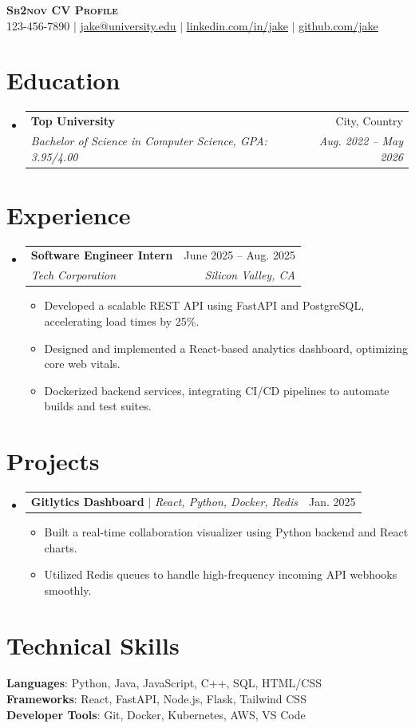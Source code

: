 \documentclass[letterpaper,11pt]{article}
\makeatletter
\newcommand{\resumeItem}[1]{
  \item\small{
    {#1 \vspace{-2pt}}
  }
}
\newcommand{\resumeSubheading}[4]{
  \vspace{-2pt}\item
    \begin{tabular*}{0.97\textwidth}[t]{l@{\extracolsep{\fill}}r}
      \textbf{#1} & #2 \\
      \textit{\small#3} & \textit{\small #4} \\
    \end{tabular*}\vspace{-7pt}
}
\newcommand{\resumeProjectHeading}[2]{
    \item
    \begin{tabular*}{0.97\textwidth}{l@{\extracolsep{\fill}}r}
      \small#1 & #2 \\
    \end{tabular*}\vspace{-7pt}
}
\newcommand{\resumeSubHeadingListStart}{\begin{itemize}[leftmargin=0.15in, label={}]}
\newcommand{\resumeSubHeadingListEnd}{\end{itemize}}
\newcommand{\resumeItemListStart}{\begin{itemize}}
\newcommand{\resumeItemListEnd}{\end{itemize}\vspace{-5pt}}
\makeatother
\begin{document}
\begin{center}
    \textbf{\Huge \scshape Sb2nov CV Profile} \\ \vspace{1pt}
    \small 123-456-7890 $|$ \href{mailto:jake@university.edu}{\underline{jake@university.edu}} $|$ 
    \href{https://linkedin.com}{\underline{linkedin.com/in/jake}} $|$
    \href{https://github.com}{\underline{github.com/jake}}
\end{center}

\section{Education}
  \resumeSubHeadingListStart
    \resumeSubheading
      {Top University}{City, Country}
      {Bachelor of Science in Computer Science, GPA: 3.95/4.00}{Aug. 2022 -- May 2026}
  \resumeSubHeadingListEnd

\section{Experience}
  \resumeSubHeadingListStart
    \resumeSubheading
      {Software Engineer Intern}{June 2025 -- Aug. 2025}
      {Tech Corporation}{Silicon Valley, CA}
      \resumeItemListStart
        \resumeItem{Developed a scalable REST API using FastAPI and PostgreSQL, accelerating load times by 25\%.}
        \resumeItem{Designed and implemented a React-based analytics dashboard, optimizing core web vitals.}
        \resumeItem{Dockerized backend services, integrating CI/CD pipelines to automate builds and test suites.}
      \resumeItemListEnd
  \resumeSubHeadingListEnd

\section{Projects}
  \resumeSubHeadingListStart
    \resumeProjectHeading
      {\textbf{Gitlytics Dashboard} $|$ \emph{React, Python, Docker, Redis}}{Jan. 2025}
      \resumeItemListStart
        \resumeItem{Built a real-time collaboration visualizer using Python backend and React charts.}
        \resumeItem{Utilized Redis queues to handle high-frequency incoming API webhooks smoothly.}
      \resumeItemListEnd
  \resumeSubHeadingListEnd

\section{Technical Skills}
 \begin{itemize}[leftmargin=0.15in, label={}]
    \small{\item{
     \textbf{Languages}{: Python, Java, JavaScript, C++, SQL, HTML/CSS} \\
     \textbf{Frameworks}{: React, FastAPI, Node.js, Flask, Tailwind CSS} \\
     \textbf{Developer Tools}{: Git, Docker, Kubernetes, AWS, VS Code}
    }}
 \end{itemize}
\end{document}
